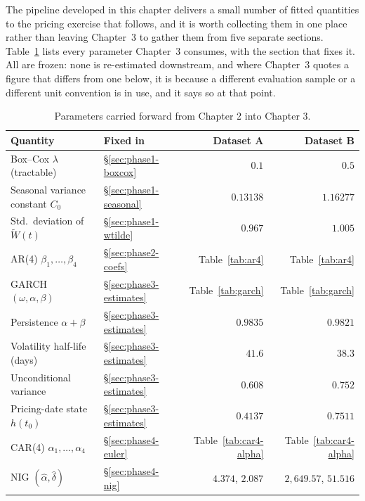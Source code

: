The pipeline developed in this chapter delivers a small number of fitted quantities to the pricing exercise that follows, and it is worth collecting them in one place rather than leaving Chapter~3 to gather them from five separate sections. Table~\ref{tab:handover} lists every parameter Chapter~3 consumes, with the section that fixes it. All are frozen: none is re-estimated downstream, and where Chapter~3 quotes a figure that differs from one below, it is because a different evaluation sample or a different unit convention is in use, and it says so at that point.

\begin{table}[htbp]
\centering
\small
\caption{Parameters carried forward from Chapter 2 into Chapter 3.}
\label{tab:handover}
\begin{tabular}{l l r r}
\toprule
\textbf{Quantity} & \textbf{Fixed in} & \textbf{Dataset A} & \textbf{Dataset B} \\
\midrule
Box--Cox $\lambda$ (tractable) & \S\ref{sec:phase1-boxcox} & $0.1$ & $0.5$ \\
Seasonal variance constant $C_0$ & \S\ref{sec:phase1-seasonal} & $0.13138$ & $1.16277$ \\
Std.\ deviation of $\widetilde W(t)$ & \S\ref{sec:phase1-wtilde} & $0.967$ & $1.005$ \\
AR(4) $\beta_1,\dots,\beta_4$ & \S\ref{sec:phase2-coefs} & Table~\ref{tab:ar4} & Table~\ref{tab:ar4} \\
GARCH $(\omega,\alpha,\beta)$ & \S\ref{sec:phase3-estimates} & Table~\ref{tab:garch} & Table~\ref{tab:garch} \\
Persistence $\alpha+\beta$ & \S\ref{sec:phase3-estimates} & $0.9835$ & $0.9821$ \\
Volatility half-life (days) & \S\ref{sec:phase3-estimates} & $41.6$ & $38.3$ \\
Unconditional variance & \S\ref{sec:phase3-estimates} & $0.608$ & $0.752$ \\
Pricing-date state $h(t_0)$ & \S\ref{sec:phase3-estimates} & $0.4137$ & $0.7511$ \\
CAR(4) $\alpha_1,\dots,\alpha_4$ & \S\ref{sec:phase4-euler} & Table~\ref{tab:car4-alpha} & Table~\ref{tab:car4-alpha} \\
NIG $(\hat\alpha,\hat\delta)$ & \S\ref{sec:phase4-nig} & $4.374$, $2.087$ & $2{,}649.57$, $51.516$ \\
\bottomrule
\end{tabular}
\end{table}


